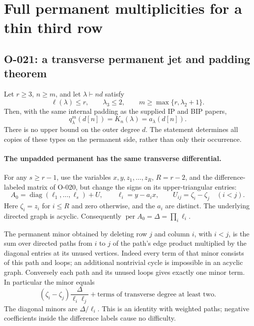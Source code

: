 \section{Full permanent multiplicities for a thin third row}

\subsection{O-021: a transverse permanent jet and padding theorem}
Let $r\geq3$, $n\geq m$, and let $\lambda\vdash nd$ satisfy
\[
       \ell(\lambda)\leq r,\qquad \lambda_3\leq2,\qquad
                    m\geq\max\{r,\lambda_2+1\}.
\]
Then, with the same internal padding as the supplied IP and
BIP papers,
\[
                    q^m_\lambda(d[n])
                         =K_n(\lambda)=a_\lambda(d[n]).
                                                               \tag{O-021.1}
\]
There is no upper bound on the outer degree $d$.
The statement determines all copies of these types on the
permanent side, rather than only their occurrence.

\paragraph{The unpadded permanent has the same transverse differential.}
For any $s\geq r-1$, use the variables
$x,y,z_1,\ldots,z_R$, $R=r-2$, and the difference-labeled
matrix of O-020, but change the signs on its upper-triangular
entries:
\[
        A_0=\operatorname{diag}(\ell_1,\ldots,\ell_s)+U,
        \qquad \ell_i=y-a_i x,\qquad
        U_{ij}=\zeta_i-\zeta_j\quad(i<j).
\]
Here $\zeta_i=z_i$ for $i\leq R$ and zero otherwise,
and the $a_i$ are distinct. The underlying directed graph
is acyclic. Consequently
$\operatorname{per}A_0=\Delta=\prod_i\ell_i$.

The permanent minor obtained by deleting row $j$ and
column $i$, with $i<j$, is the sum over directed paths
from $i$ to $j$ of the path's edge product multiplied
by the diagonal entries at its unused vertices.
Indeed every term of that minor consists of this path
and loops; an additional nontrivial cycle is impossible
in an acyclic graph. Conversely each path and its unused
loops gives exactly one minor term. In particular the
minor equals
\[
        (\zeta_i-\zeta_j)\frac{\Delta}{\ell_i\ell_j}
               +\text{terms of transverse degree at least two}.
                                                               \tag{O-021.2}
\]
The diagonal minors are $\Delta/\ell_i$.
This is an identity with weighted paths; negative coefficients
inside the difference labels cause no difficulty.

